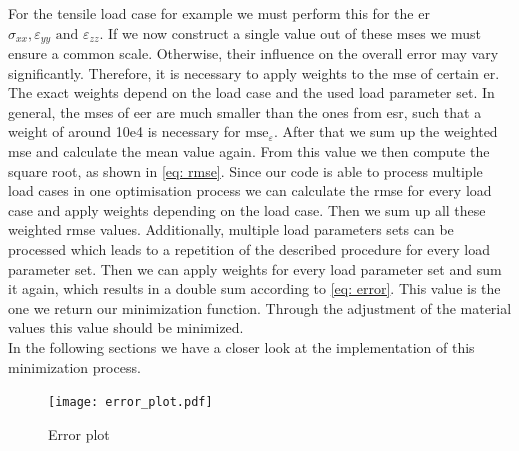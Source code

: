 For the tensile load case for example we must perform this for the \acrlong{er} $\sigma_{xx}, \varepsilon_{yy} \text{ and } \varepsilon_{zz}$. 
If we now construct a single value out of these \acrshort{mse}s we must ensure a common scale. Otherwise, their influence on the overall error may vary significantly. Therefore, it is necessary to apply weights to the \acrshort{mse} of certain \acrlong{er}. The exact weights depend on the load case and the used load parameter set. In general, the \acrshort{mse}s of \acrlong{eer} are much smaller than the ones from \acrlong{esr}, such that a weight of around 10e4 is necessary for $\text{mse}_{\varepsilon}$. After that we sum up the weighted \acrshort{mse} and calculate the mean value again. From this value we then compute the square root, as shown in \autoref{eq: rmse}. Since our code is able to process multiple load cases in one optimisation process we can calculate the \acrshort{rmse} for every load case and apply weights depending on the load case. Then we sum up all these weighted \acrshort{rmse} values. Additionally, multiple load parameters sets can be processed which leads to a repetition of the described procedure for every load parameter set. Then we can apply weights for every load parameter set and sum it again, which results in a double sum according to \autoref{eq: error}. This value is the one we return our minimization function. Through the adjustment of the material values this value should be minimized. \\
In the following sections we have a closer look at the implementation of this minimization process. 

\begin{figure}[H]
    \centering
    \texttt{[image: error\_plot.pdf]}
    \caption{Error plot}
    \label{fig: erroPlot}
\end{figure}


